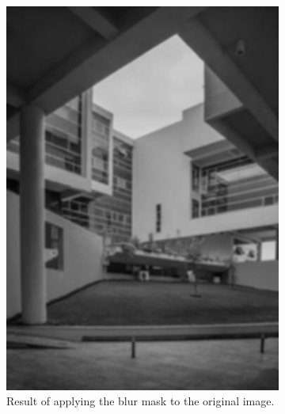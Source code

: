 \documentclass[addpoints]{exam}
\begin{document}
\begin{figure}
\begin{subfigure}[c]{.31\textwidth}
      \includegraphics[width=\textwidth]{campus-blur}
      \caption{Result of applying the blur mask to the original image.}\label{fig:mask-blur}
    \end{subfigure}
    \begin{subfigure}[c]{.31\textwidth}

\end{subfigure}
\end{figure}
\end{document}
